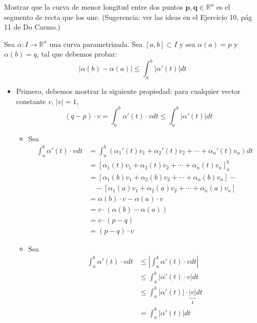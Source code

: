 \begin{problema}
    Mostrar que la curva de menor longitud entre dos puntos $\mathbf{p}, \mathbf{q} \in \mathbb{R}^{n}$ es el segmento de recta que los une. (Sugerencia: ver las ideas en el Ejercicio 10, pág 11 de Do Carmo.) 
    \begin{sol}
        Sea $\alpha: I\to \mathbb{R}^n$ una curva parametrizada. Sea $[a,b]\subset I$ y sea $\alpha(a)=p$ y $\alpha(b)=q$, tal que debemos probar: 
        $$|\alpha(b)-\alpha(a)|\leq \int_a^b |\alpha'(t)|dt$$
        \begin{itemize}
            \item Primero, debemos mostrar la siguiente propiedad: para cualquier vector constante $v$, $|v|=1$, 
            $$(q-p)\cdot v= \int_{a}^{b}\alpha'(t)\cdot vdt \leq \int_{a}^{b}|\alpha '(t)|dt$$
            \begin{itemize}
                \item Sea
                    \begin{align*}
                        \int_{a}^{b}\alpha'(t)\cdot vdt &= \int_{a}^{b}\left(\alpha_1'(t)v_1+\alpha_2'(t)v_2+\cdots +\alpha_n'(t)v_n\right) dt\\
                        &= \left[\alpha_1(t)v_1+\alpha_2(t)v_2+\cdots +\alpha_n(t)v_n\right]_{a}^b\\
                        &= \left[\alpha_1(b)v_1+\alpha_2(b)v_2+\cdots +\alpha_n(b)v_n\right]-\\
                        & \ \ \ \ -\left[\alpha_1(a)v_1+\alpha_2(a)v_2+\cdots +\alpha_n(a)v_n\right]\\
                        &= \alpha(b)\cdot v - \alpha(a)\cdot v\\
                        &= v\cdot (\alpha(b) - \alpha(a))\\
                        &= v\cdot (p-q)\\
                        &= (p-q)\cdot v
                    \end{align*}
                \item Sea 
                    \begin{align*}
                        \int_{a}^{b}\alpha'(t)\cdot vdt &\leq \left|\int_{a}^{b}\alpha'(t)\cdot vdt\right|\\
                        &\leq \int_{a}^{b}|\alpha'(t)\cdot v|dt\\
                        &\leq \int_{a}^{b}|\alpha'(t)|\cdot \underbrace{|v|}_{1}dt\\
                        &= \int_{a}^{b}|\alpha'(t)|dt

\end{align*}
\end{itemize}
\end{itemize}
\end{sol}
\end{problema}
